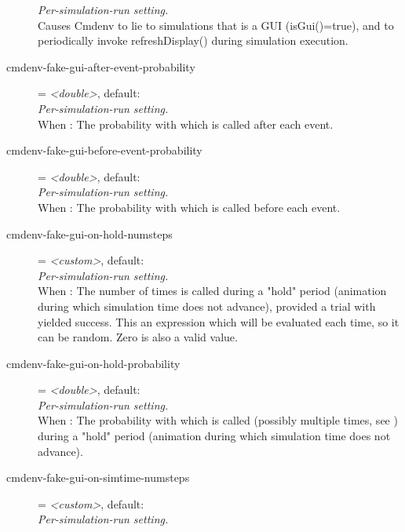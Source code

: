 \begin{description}
    \textit{Per-simulation-run setting.}\\
    Causes Cmdenv to lie to simulations that is a GUI (isGui()=true), and to
    periodically invoke refreshDisplay() during simulation execution.
\item[cmdenv-fake-gui-after-event-probability] = \textit{<double>}, default: \\
    \textit{Per-simulation-run setting.}\\
    When : The
    probability with which  is called after each event.
\item[cmdenv-fake-gui-before-event-probability] = \textit{<double>}, default: \\
    \textit{Per-simulation-run setting.}\\
    When : The
    probability with which  is called before each
    event.
\item[cmdenv-fake-gui-on-hold-numsteps] = \textit{<custom>}, default: \\
    \textit{Per-simulation-run setting.}\\
    When : The
    number of times  is called during a "hold" period
    (animation during which simulation time does not advance), provided a trial
    with
    yielded success. This an expression which will be evaluated each time, so
    it can be random. Zero is also a valid value.
\item[cmdenv-fake-gui-on-hold-probability] = \textit{<double>}, default: \\
    \textit{Per-simulation-run setting.}\\
    When : The
    probability with which  is called (possibly
    multiple times, see
    )
    during a "hold" period (animation during which simulation time does not
    advance).
\item[cmdenv-fake-gui-on-simtime-numsteps] = \textit{<custom>}, default: \\
    \textit{Per-simulation-run setting.}\\

\end{description}
